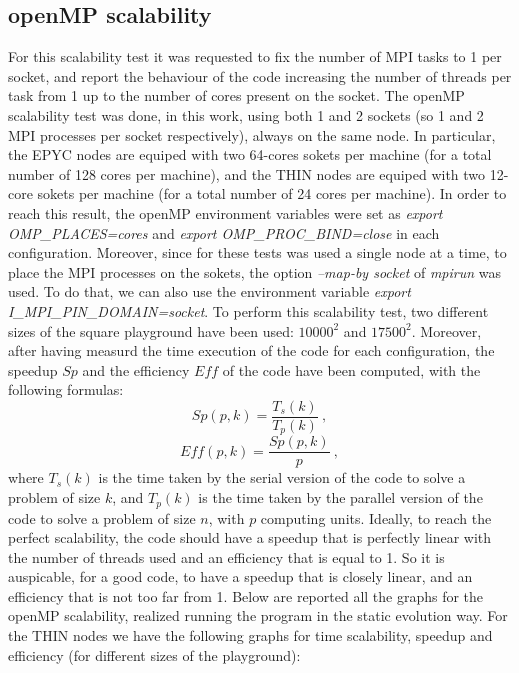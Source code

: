 \documentclass[12pt, titlepage]{report}
\begin{document}
\subsection{openMP scalability}
For this scalability test it was requested to fix the number of MPI tasks to 1 per socket, and report the behaviour of the code increasing 
the number of threads per task from 1 up to the number of cores present on the socket. The openMP scalability test was done, in this work, using both 1
and 2 sockets (so 1 and 2 MPI processes per socket respectively), always on the same node. In particular, the EPYC nodes are equiped with two 64-cores sokets per machine (for a total number of 128 cores per machine),
and the THIN nodes are equiped with two 12-core sokets per machine (for a total number of 24 cores per machine). In order to reach this result, 
the openMP environment variables were set as \emph{export OMP\_PLACES=cores} and \emph{export OMP\_PROC\_BIND=close} in each configuration. Moreover, since for 
these tests was used a single node at a time, to place the MPI processes on the sokets, the option \emph{--map-by socket} of \emph{mpirun} was used. 
To do that, we can also use the environment variable \emph{export I\_MPI\_PIN\_DOMAIN=socket}. To perform this scalability test, two different sizes of the square playground
have been used: $10000^2$ and $17500^2$. Moreover, after having measurd the time execution of the code for each configuration, the speedup $Sp$ and the eﬀiciency $Eff$ of the code
have been computed, with the following formulas:
\begin{equation}
	Sp(p,k) = \frac{T_s(k)}{T_p(k)} \ ,
\end{equation}
\begin{equation}
	Eff(p,k) = \frac{Sp(p,k)}{p} \ ,
\end{equation}
where $T_s(k)$ is the time taken by the serial version of the code to solve a problem of size $k$, and
$T_p(k)$ is the time taken by the parallel version of the code to solve a problem of size $n$, with $p$ computing units.
Ideally, to reach the perfect scalability, the code should have a speedup that is perfectly linear with the number of threads used and an eﬀiciency that is equal to 1. 
So it is auspicable, for a good code, to have a speedup that is closely linear, and an eﬀiciency that is not too far from 1.
Below are reported all the graphs for the openMP scalability, realized running the program in the static evolution way.
For the THIN nodes we have the following graphs for time scalability, speedup and efficiency (for different sizes of the playground): \\
\end{document}
